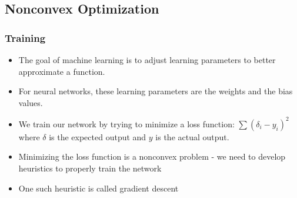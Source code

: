 \documentclass{beamer}
\begin{document}
    \subsection{Nonconvex Optimization}
\begin{frame}
    \frametitle{Training}
    \begin{itemize}
        \item The goal of machine learning is to adjust learning parameters to better approximate a function.
        \item For neural networks, these learning parameters are the weights and the bias values.
        \item We train our network by trying to minimize a loss function:  $\sum (\delta_{i}-y_{i})^2$ where $\delta$ is the expected output and $y$ is the actual output.
        \item Minimizing the loss function is a nonconvex problem - we need to develop heuristics to properly train the network
        \item One such heuristic is called gradient descent
    \end{itemize}
\end{frame}
\end{document}
